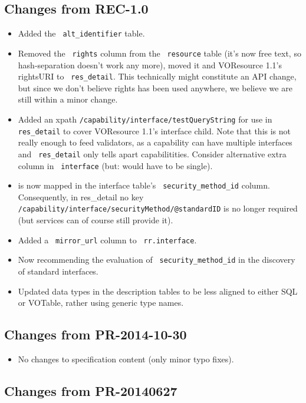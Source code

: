 \documentclass[11pt,a4paper]{ivoa}
\newcommand{\rtent}[1]{\texttt{\color{rtcolor} #1}}
\begin{document}
\subsection{Changes from REC-1.0}

\begin{itemize}
\item Added the \rtent{alt\_identifier} table.
\item Removed the \rtent{rights} column from the \rtent{resource} table
(it's now free text, so hash-separation doesn't work any more),
moved it and VOResource 1.1's rightsURI to \rtent{res\_detail}.  This
technically might constitute an API change, but since we don't believe
rights has been used anywhere, we believe we are still within a minor
change.
\item Added an xpath \texttt{/capability/interface/testQueryString} for
use in
\rtent{res\_detail} to cover VOResource 1.1's 
interface child.  Note that this is not really enough to feed
validators, as a capability can have multiple interfaces and
\rtent{res\_detail} only tells apart capabilitities.  Consider
alternative extra column in \rtent{interface} (but:
 would have to be single).
\item {} is now mapped in the interface
table's \rtent{security\_method\_id} column.  Consequently, in res\_detail
no key
\texttt{/capability/inter\-face/securityMethod/@standardID} 
is no longer required (but services can of course still provide it).
\item Added a \rtent{mirror\_url} column to \rtent{rr.interface}.
\item Now recommending the evaluation of \rtent{security\_method\_id} in
the discovery of standard interfaces.
\item Updated data types in the description tables to be less aligned to
either SQL or VOTable, rather using generic type names.
\end{itemize}

\subsection{Changes from PR-2014-10-30}

\begin{itemize}
\item No changes to specification content (only minor typo fixes).
\end{itemize}


\subsection{Changes from PR-20140627}
\end{document}
